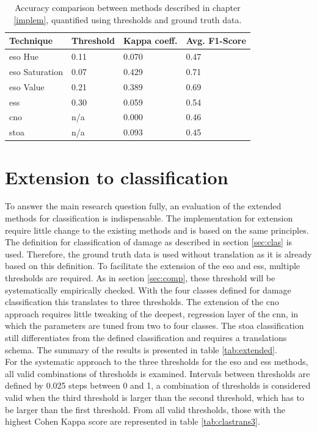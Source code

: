 \begin{table} [H]
	\centering
	\footnotesize
	\captionsetup{justification=raggedright,singlelinecheck=false}
	\caption{\footnotesize{Accuracy comparison between methods described in chapter \ref{implem}, quantified using thresholds and ground truth data.}}	
	\begin{tabular}{llll}
		\toprule
		Technique & Threshold & Kappa coeff. & Avg. F1-Score \\
		\midrule			
		\ac{eso} Hue & 0.11 & 0.070 & 0.47\\
		\ac{eso} Saturation & 0.07 & 0.429 & 0.71\\
		\ac{eso} Value & 0.21 & 0.389 & 0.69\\
		\ac{ess} & 0.30 & 0.059 & 0.54\\
		\midrule
		\ac{cno} & n/a & 0.000 & 0.46\\
		\midrule
		\ac{stoa} & n/a & 0.093 & 0.45\\
		\bottomrule
	\end{tabular}
\label{tab:eso}
\end{table} 
\section{Extension to classification} \label{sec:ext}
To answer the main research question fully, an evaluation of the extended methods for classification is indispensable. The implementation for extension require little change to the existing methods and is based on the same principles. The definition for classification of damage as described in section \ref{sec:clas} is used. Therefore, the ground truth data is used without translation as it is already based on this definition. To facilitate the extension of the \ac{eso} and \ac{ess}, multiple thresholds are required. As in section \ref{sec:comp}, these threshold will be systematically empirically checked. With the four classes defined for damage classification this translates to three thresholds. The extension of the \ac{cno} approach requires little tweaking of the deepest, regression layer of the \ac{cnn}, in which the parameters are tuned from two to four classes. The \ac{stoa} classification still differentiates from the defined classification and requires a translations schema. The summary of the results is presented in table \ref{tab:extended}.\\

\noindent For the systematic approach to the three thresholds for the \ac{eso} and \ac{ess} methods, all valid combinations of thresholds is examined. Intervals between thresholds are defined by 0.025 steps between 0 and 1, a combination of thresholds is considered valid when the third threshold is larger than the second threshold, which has to be larger than the first threshold. From all valid thresholds, those with the highest Cohen Kappa score are represented in table \ref{tab:clastrans3}.\\

